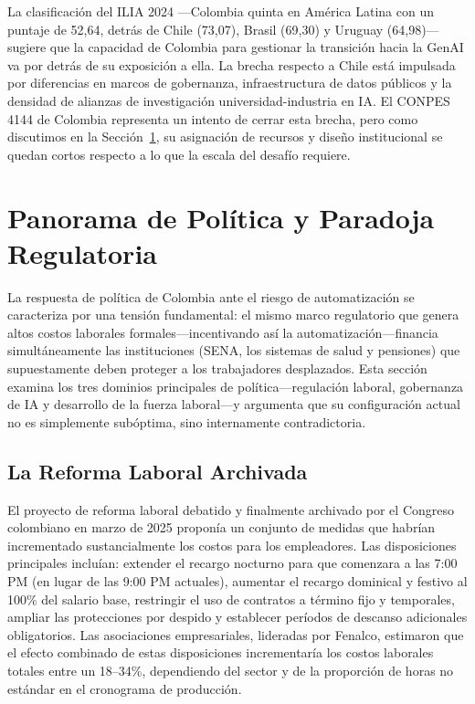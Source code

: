 \documentclass{article}
\begin{document}
La clasificaci\'on del ILIA 2024 \cite{ilia2024}---Colombia quinta en Am\'erica Latina con un puntaje de 52,64, detr\'as de Chile (73,07), Brasil (69,30) y Uruguay (64,98)---sugiere que la capacidad de Colombia para gestionar la transici\'on hacia la GenAI va por detr\'as de su exposici\'on a ella. La brecha respecto a Chile est\'a impulsada por diferencias en marcos de gobernanza, infraestructura de datos p\'ublicos y la densidad de alianzas de investigaci\'on universidad-industria en IA. El CONPES 4144 de Colombia \cite{conpes4144} representa un intento de cerrar esta brecha, pero como discutimos en la Secci\'on~\ref{sec:policy}, su asignaci\'on de recursos y dise\~no institucional se quedan cortos respecto a lo que la escala del desaf\'io requiere.


\FloatBarrier

\section{Panorama de Pol\'itica y Paradoja Regulatoria}
\label{sec:policy}

La respuesta de pol\'itica de Colombia ante el riesgo de automatizaci\'on se caracteriza por una tensi\'on fundamental: el mismo marco regulatorio que genera altos costos laborales formales---incentivando as\'i la automatizaci\'on---financia simult\'aneamente las instituciones (SENA, los sistemas de salud y pensiones) que supuestamente deben proteger a los trabajadores desplazados. Esta secci\'on examina los tres dominios principales de pol\'itica---regulaci\'on laboral, gobernanza de IA y desarrollo de la fuerza laboral---y argumenta que su configuraci\'on actual no es simplemente sub\'optima, sino internamente contradictoria.

\subsection{La Reforma Laboral Archivada}
\label{subsec:labor_reform}

El proyecto de reforma laboral debatido y finalmente archivado por el Congreso colombiano en marzo de 2025 propon\'ia un conjunto de medidas que habr\'ian incrementado sustancialmente los costos para los empleadores. Las disposiciones principales inclu\'ian: extender el recargo nocturno para que comenzara a las 7:00 PM (en lugar de las 9:00 PM actuales), aumentar el recargo dominical y festivo al 100\% del salario base, restringir el uso de contratos a t\'ermino fijo y temporales, ampliar las protecciones por despido y establecer per\'iodos de descanso adicionales obligatorios. Las asociaciones empresariales, lideradas por Fenalco, estimaron que el efecto combinado de estas disposiciones incrementar\'ia los costos laborales totales entre un 18--34\%, dependiendo del sector y de la proporci\'on de horas no est\'andar en el cronograma de producci\'on.
\end{document}

